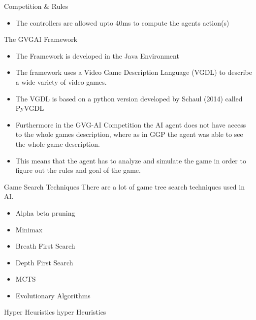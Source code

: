 \documentclass{beamer}
\begin{document}
\begin{frame}{Competition \& Rules}		
			\begin{itemize}
			
			\item The controllers are allowed upto 40ms to compute the agents action(s)  \pause

		\end{itemize}
\end{frame}


\begin{frame}{The GVGAI Framework}		
			\begin{itemize}
			\item The Framework is developed in the Java Environment \pause
			\item The framework uses a Video Game Description Language (VGDL) to describe a wide variety of video games. \pasue
			\item The VGDL is based on a python version developed by Schaul (2014) called PyVGDL \pause
			\item  Furthermore in the GVG-AI Competition the AI agent does not have access to the whole games description, where as in GGP the agent was able to see the whole game description. \pause
			\item  This means that the agent has to analyze and simulate the game in order to figure out the rules and goal of the game. \pause
		\end{itemize}
\end{frame}

\begin{frame}{Game Search Techniques}
		There are a lot of game tree search techniques used in AI. 
			\begin{itemize}
			\item Alpha beta pruning \pause
			\item Minimax \pause
			\item Breath First Search \pause
			\item Depth First Search \pause
			\item MCTS \pause
			\item Evolutionary Algorithms \pause
		\end{itemize}
\end{frame}

\begin{frame}{Hyper Heuristics}
hyper Heuristics 
	
\end{frame}
\end{document}
